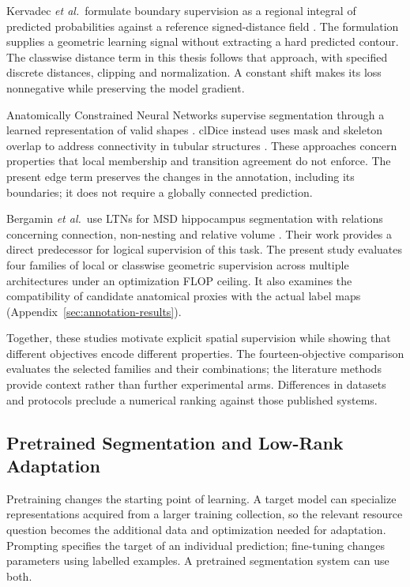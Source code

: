 \documentclass[12pt,a4paper]{article}
\begin{document}
Kervadec \emph{et al.}\ formulate boundary supervision as a regional integral
of predicted probabilities against a reference signed-distance field
\cite{kervadec2019boundary}. The formulation supplies a geometric
learning signal without extracting a hard predicted contour. The
classwise distance term in this thesis follows that approach, with
specified discrete distances, clipping and normalization. A constant
shift makes its loss nonnegative while preserving the model gradient.

Anatomically Constrained Neural Networks supervise segmentation through
a learned representation of valid shapes \cite{oktay2017anatomically}.
clDice instead uses mask and skeleton overlap to address connectivity
in tubular structures \cite{shit2021cldice}. These approaches concern
properties that local membership and transition agreement do not enforce.
The present edge term preserves the changes in the annotation, including
its boundaries; it does not require a globally connected prediction.

Bergamin \emph{et al.}\ use LTNs for MSD hippocampus segmentation with relations
concerning connection, non-nesting and relative volume
\cite{bergamin2025integrating}. Their work provides a direct predecessor
for logical supervision of this task. The present study evaluates four
families of local or classwise geometric supervision across multiple
architectures under an optimization FLOP ceiling. It also examines the
compatibility of candidate anatomical proxies with the actual label maps
(Appendix~\ref{sec:annotation-results}).

Together, these studies motivate explicit spatial supervision while
showing that different objectives encode different properties. The
fourteen-objective comparison evaluates the selected families and their
combinations; the literature methods provide context rather than further
experimental arms. Differences in datasets and protocols preclude a
numerical ranking against those published systems.

\subsection{Pretrained Segmentation and Low-Rank Adaptation}
\label{sec:pretrained-adaptation}

Pretraining changes the starting point of learning. A target model can
specialize representations acquired from a larger training collection,
so the relevant resource question becomes the additional data and
optimization needed for adaptation. Prompting specifies the target of
an individual prediction; fine-tuning changes parameters using labelled
examples. A pretrained segmentation system can use both.
\end{document}
